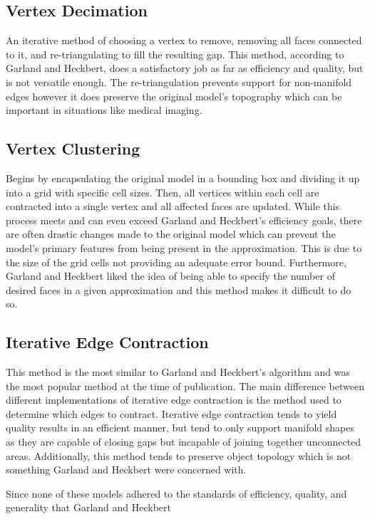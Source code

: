 \documentclass{acmsiggraph}
\begin{document}
\subsection{Vertex Decimation}
An iterative method of choosing a vertex to remove, removing all faces
connected to it, and re-triangulating to fill the resulting gap. This method,
according to Garland and Heckbert, does a satisfactory job as far as efficiency
and quality, but is not versatile enough. The re-triangulation prevents support
for non-manifold edges however it does preserve the original model’s topography
which can be important in situations like medical imaging.

\subsection{Vertex Clustering}
Begins by encapsulating the original model in a bounding box and dividing it up
into a grid with specific cell sizes. Then, all vertices within each cell are
contracted into a single vertex and all affected faces are updated. While this
process meets and can even exceed Garland and Heckbert’s efficiency goals,
there are often drastic changes made to the original model which can prevent
the model’s primary features from being present in the approximation. This is
due to the size of the grid cells not providing an adequate error bound.
Furthermore, Garland and Heckbert liked the idea of being able to specify the
number of desired faces in a given approximation and this method makes it
difficult to do so.

\subsection{Iterative Edge Contraction}
This method is the most similar to Garland and Heckbert’s algorithm and was the
most popular method at the time of publication. The main difference between
different implementations of iterative edge contraction is the method used to
determine which edges to contract. Iterative edge contraction tends to yield
quality results in an efficient manner, but tend to only support manifold
shapes as they are capable of closing gaps but incapable of joining together
unconnected areas. Additionally, this method tends to preserve object topology
which is not something Garland and Heckbert were concerned with.

Since none of these models adhered to the standards of efficiency, quality, and
generality that Garland and Heckbert %
\end{document}
